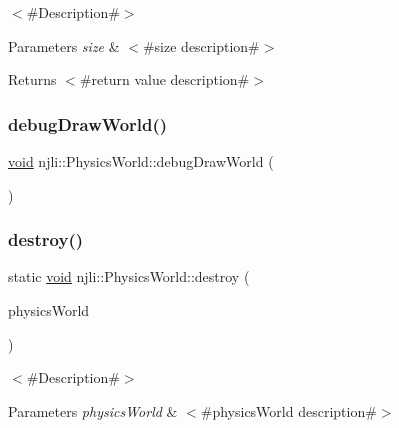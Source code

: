 $<$\#\+Description\#$>$


\begin{DoxyParams}{Parameters}
{\em size} & $<$\#size description\#$>$\\
\hline
\end{DoxyParams}
\begin{DoxyReturn}{Returns}
$<$\#return value description\#$>$ 
\end{DoxyReturn}
\mbox{\label{classnjli_1_1_physics_world_a5e3b0fcf00fc8a8151510c86088c034f}} 
\subsubsection{\texorpdfstring{debug\+Draw\+World()}{debugDrawWorld()}}
{\footnotesize\ttfamily \mbox{\hyperlink{_thread_8h_af1e856da2e658414cb2456cb6f7ebc66}{void}} njli\+::\+Physics\+World\+::debug\+Draw\+World (\begin{DoxyParamCaption}{ }\end{DoxyParamCaption})\hspace{0.3cm}{\ttfamily [protected]}}

\mbox{\label{classnjli_1_1_physics_world_a6d6e3b4603d5804e69c6644094c11cc4}} 
\subsubsection{\texorpdfstring{destroy()}{destroy()}}
{\footnotesize\ttfamily static \mbox{\hyperlink{_thread_8h_af1e856da2e658414cb2456cb6f7ebc66}{void}} njli\+::\+Physics\+World\+::destroy (\begin{DoxyParamCaption}\item[{\mbox{\hyperlink{classnjli_1_1_physics_world}{Physics\+World}} $\ast$}]{physics\+World }\end{DoxyParamCaption})\hspace{0.3cm}{\ttfamily [static]}}

$<$\#\+Description\#$>$


\begin{DoxyParams}{Parameters}
{\em physics\+World} & $<$\#physics\+World description\#$>$ \\
\hline
\end{DoxyParams}
\mbox{\label{classnjli_1_1_physics_world_a2abce5fcfb7f547fdd056717ac44247f}} 
